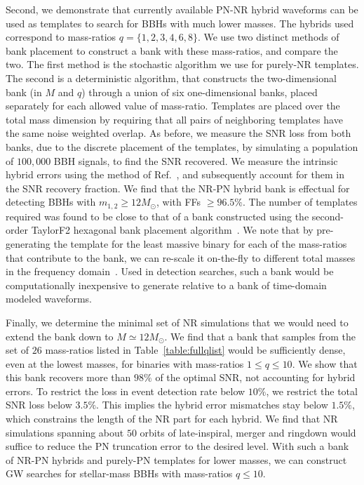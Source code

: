 Second, we demonstrate that currently available PN-NR hybrid waveforms can be 
used as templates to search for BBHs with much lower masses. The hybrids
used correspond to mass-ratios $q=\{1,2,3,4,6,8\}$. We use two distinct methods
of bank placement to construct a bank with these mass-ratios, and compare the
two. The first method is the stochastic algorithm we use for purely-NR 
templates. The second is a deterministic algorithm, that constructs the 
two-dimensional bank (in $M$ and $q$) through a union of six one-dimensional
banks, placed separately for each allowed value of mass-ratio. Templates are
placed over the total mass dimension by requiring that all pairs of neighboring
templates have the same noise weighted overlap. As before, we measure the SNR 
loss from both banks, due to the discrete placement of the templates, by 
simulating a population of $100,000$ BBH signals, to find the SNR recovered.
We measure the intrinsic hybrid errors using the method of
Ref.~\cite{MacDonald:2011ne,MacDonald:2012mp}, and subsequently account for 
them in the SNR recovery fraction. We find that the NR-PN
hybrid bank is effectual for detecting BBHs with $m_{1,2}\geq 12M_{\odot}$, 
with FFs $\geq 96.5\%$. The number of templates required was found
to be close to that of a bank constructed using the second-order TaylorF2
hexagonal bank placement algorithm~\cite{Sathyaprakash:1991mt,SathyaMetric2PN,
OwenTemplateSpacing,BabaketalBankPlacement,
SathyaBankPlacementTauN,Cokelaer:2007kx}. We note that by pre-generating the
template for the least massive binary for each of the mass-ratios that 
contribute to the bank, we can re-scale it on-the-fly to different total 
masses in the frequency domain~\cite{Sathyaprakash:2000qx}. 
Used in detection searches, such a bank would be computationally inexpensive 
to generate relative to a bank of time-domain modeled waveforms.

Finally, we determine the minimal set of NR simulations that we would need to 
extend the bank down to $M\simeq 12M_\odot$. We find that a bank that
samples from the set of $26$ mass-ratios listed in Table~\ref{table:fullqlist}
would be sufficiently dense, even at the lowest masses, for binaries with 
mass-ratios $1\leq q\leq 10$. We show that this bank recovers more than
$98\%$ of the optimal SNR, not accounting for hybrid errors. 
To restrict the loss in event detection 
rate below $10\%$, we restrict the total SNR loss below $3.5\%$. 
This implies the hybrid error mismatches stay below $1.5\%$, which 
constrains the length of the NR part for each hybrid.
We find that NR simulations spanning about $50$ orbits of late-inspiral, merger
and ringdown would suffice to reduce the PN truncation error to the desired 
level. With such a bank of NR-PN hybrids and purely-PN templates for lower
masses, we can construct GW searches for stellar-mass BBHs with mass-ratios 
$q\leq 10$.

